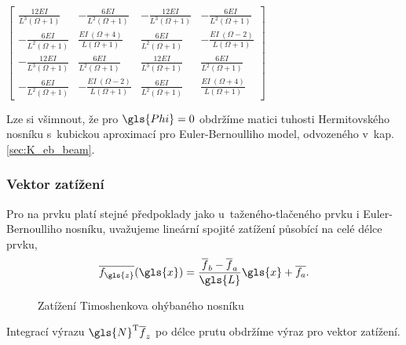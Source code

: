    $\displaystyle \left[\begin{matrix}\frac{12 E I}{L^{3} \left(\Omega + 1\right)} & - \frac{6 E I}{L^{2} \left(\Omega + 1\right)} & - \frac{12 E I}{L^{3} \left(\Omega + 1\right)} & - \frac{6 E I}{L^{2} \left(\Omega + 1\right)}\\- \frac{6 E I}{L^{2} \left(\Omega + 1\right)} & \frac{E I~\left(\Omega + 4\right)}{L \left(\Omega + 1\right)} & \frac{6 E I}{L^{2} \left(\Omega + 1\right)} & - \frac{E I~\left(\Omega - 2\right)}{L \left(\Omega + 1\right)}\\- \frac{12 E I}{L^{3} \left(\Omega + 1\right)} & \frac{6 E I}{L^{2} \left(\Omega + 1\right)} & \frac{12 E I}{L^{3} \left(\Omega + 1\right)} & \frac{6 E I}{L^{2} \left(\Omega + 1\right)}\\- \frac{6 E I}{L^{2} \left(\Omega + 1\right)} & - \frac{E I~\left(\Omega - 2\right)}{L \left(\Omega + 1\right)} & \frac{6 E I}{L^{2} \left(\Omega + 1\right)} & \frac{E I~\left(\Omega + 4\right)}{L \left(\Omega + 1\right)}\end{matrix}\right]$

\vspace{0.3cm}
Lze si všimnout, že pro $\gls{Phi} = 0$ obdržíme matici tuhosti Hermitovského nosníku s~kubickou aproximací pro Euler-Bernoulliho model, odvozeného v~kap. \ref{sec:K_eb_beam}.
        

\subsubsection*{Vektor zatížení}

Pro na prvku platí stejné předpoklady jako u~taženého-tlačeného prvku i Euler-Bernoulliho nosníku,
uvažujeme lineární spojité zatížení působící na celé délce prvku,
\begin{equation}
    \overline{f_{\gls{z}}}(\gls{x}) = \frac{\overline{f}_b - \overline{f}_a}{\gls{L}} \gls{x} + \overline{f_a}.
\end{equation}
\begin{figure}[H]
    
    \caption{Zatížení Timoshenkova ohýbaného nosníku}
    \label{fig:tim_beam_load}
\end{figure}        

Integrací výrazu $\gls{N}^\mathrm{T} \overline{f}_z$ po délce prutu obdržíme výraz pro vektor zatížení.

